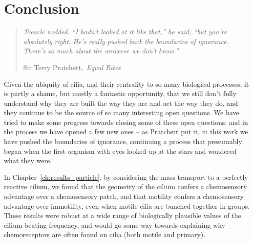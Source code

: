 \setchapterpreamble[u]{\optmargintoc}
\chapter{Conclusion}

\begin{quote}
    \textit{%
        Treacle nodded. ``I hadn't looked at it like that,'' he said, ``but you're absolutely right. He's really pushed back the boundaries of ignorance. There's so much about the universe we don't know.''%
    }%
    
    \hfill Sir Terry Pratchett,~\textit{Equal Rites}
\end{quote}

Given the ubiquity of cilia, and their centrality to so many biological processes, it is partly a shame, but mostly a fantastic opportunity, that we still don't fully understand why they are built the way they are and act the way they do, and they continue to be the source of so many interesting open questions. We have tried to make some progress towards closing some of these open questions, and in the process we have opened a few new ones -- as Pratchett put it, in this work we have pushed the boundaries of ignorance, continuing a process that presumably began when the first organism with eyes looked up at the stars and wondered what they were.


In Chapter~\ref{ch:results_particle}, by considering the mass transport to a perfectly reactive cilium, we found that the geometry of the cilium confers a chemosensory advantage over a chemosensory patch, and that motility confers a chemosensory advantage over immotility, even when motile cilia are bunched together in groups. These results were robust at a wide range of biologically plausible values of the cilium beating frequency, and would go some way towards explaining why chemoreceptors are often found on cilia (both motile and primary). 

